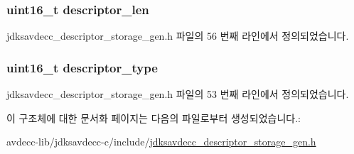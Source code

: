 \subsubsection[{\texorpdfstring{descriptor\+\_\+len}{descriptor_len}}]{\setlength{\rightskip}{0pt plus 5cm}uint16\+\_\+t descriptor\+\_\+len}\hypertarget{structjdksavdecc__descriptor__storage__gen__descriptor_af8f69a47554e1b5762d3fe71d4e5926a}{}\label{structjdksavdecc__descriptor__storage__gen__descriptor_af8f69a47554e1b5762d3fe71d4e5926a}


jdksavdecc\+\_\+descriptor\+\_\+storage\+\_\+gen.\+h 파일의 56 번째 라인에서 정의되었습니다.

\subsubsection[{\texorpdfstring{descriptor\+\_\+type}{descriptor_type}}]{\setlength{\rightskip}{0pt plus 5cm}uint16\+\_\+t descriptor\+\_\+type}\hypertarget{structjdksavdecc__descriptor__storage__gen__descriptor_ab7c32b6c7131c13d4ea3b7ee2f09b78d}{}\label{structjdksavdecc__descriptor__storage__gen__descriptor_ab7c32b6c7131c13d4ea3b7ee2f09b78d}


jdksavdecc\+\_\+descriptor\+\_\+storage\+\_\+gen.\+h 파일의 53 번째 라인에서 정의되었습니다.



이 구조체에 대한 문서화 페이지는 다음의 파일로부터 생성되었습니다.\+:\begin{DoxyCompactItemize}
\item 
avdecc-\/lib/jdksavdecc-\/c/include/\hyperlink{jdksavdecc__descriptor__storage__gen_8h}{jdksavdecc\+\_\+descriptor\+\_\+storage\+\_\+gen.\+h}\end{DoxyCompactItemize}
